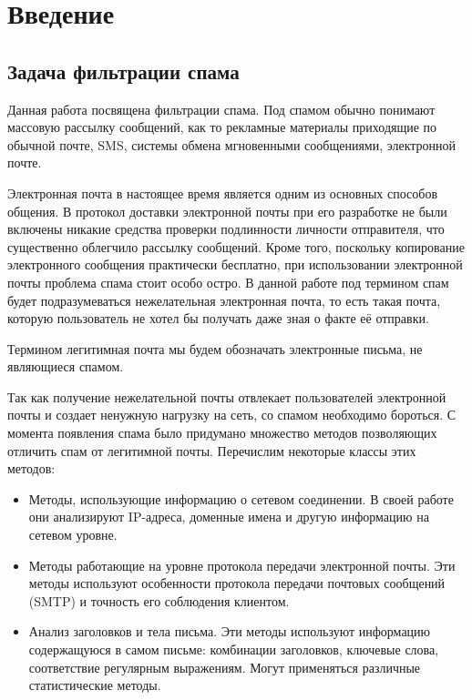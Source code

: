 \newpage
\section{Введение}



\subsection{Задача фильтрации спама}
Данная работа посвящена фильтрации спама. Под спамом обычно понимают массовую рассылку сообщений, как то рекламные материалы приходящие по обычной почте, SMS,  системы обмена мгновенными сообщениями,  электронной почте.

Электронная почта в настоящее время является одним из основных способов общения. В протокол доставки электронной почты при его разработке не были включены никакие средства проверки подлинности личности отправителя, что существенно облегчило рассылку  сообщений. Кроме того, поскольку копирование электронного сообщения практически бесплатно, при использовании электронной почты проблема спама стоит особо остро. В данной работе под термином спам будет подразумеваться нежелательная электронная почта, то есть такая почта, которую пользователь не хотел бы получать даже зная о факте её отправки.

Термином легитимная почта мы будем обозначать электронные письма, не являющиеся спамом.

Так как получение нежелательной почты отвлекает пользователей электронной почты и создает ненужную нагрузку на сеть, со спамом необходимо бороться. С момента появления спама было придумано множество методов позволяющих отличить спам от легитимной почты. Перечислим некоторые классы этих методов:
\begin{itemize}
\item Методы, использующие информацию о сетевом соединении. В своей работе они анализируют IP-адреса, доменные имена и другую информацию на сетевом уровне.
\item Методы работающие на уровне протокола передачи электронной почты. Эти методы используют особенности протокола передачи почтовых сообщений (SMTP)  и точность его соблюдения клиентом.
\item Анализ заголовков и тела письма. Эти методы используют информацию содержащуюся в самом письме: комбинации заголовков, ключевые слова, соответствие регулярным выражениям. Могут применяться различные статистические методы.
\end{itemize}

